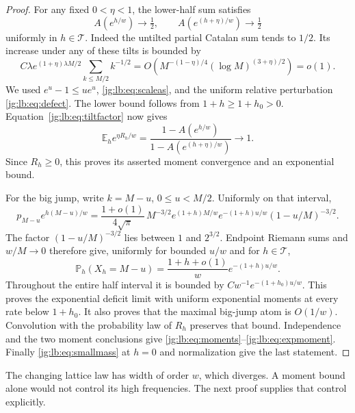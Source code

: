 \documentclass[11pt,a4paper]{article}
\theoremstyle{definition}\newaliascnt{definition}{theorem}
\theoremstyle{remark}\newaliascnt{remark}{theorem}
\newcommand{\ljP}{\mathbb P}
\newcommand{\ljE}{\mathbb E}
\begin{document}
\begin{proof}
For any fixed $0<\eta<1$, the lower-half sum satisfies
\begin{equation}\label{jg:lb:eq:smallmass}
 A(e^{h/w})\to\tfrac12,\qquad A(e^{(h+\eta)/w})\to\tfrac12
\end{equation}
uniformly in $h\in\mathcal T$. Indeed the untilted partial Catalan sum tends to
$1/2$. Its increase under any of these tilts is bounded by
\[
 C\lambda e^{(1+\eta)\lambda M/2}
       \sum_{k\le M/2}k^{-1/2}
 =O\!\left(M^{-(1-\eta)/4}
            (\log M)^{(3+\eta)/2}\right)=o(1).
\]
We used $e^u-1\le ue^u$, \eqref{jg:lb:eq:scaleas}, and the uniform relative
perturbation \eqref{jg:lb:eq:defect}. The lower bound follows from
$1+h\ge1+h_0>0$. Equation~\eqref{jg:lb:eq:tiltfactor} now gives
\[
 \ljE_h e^{\eta R_h/w}
 =\frac{1-A(e^{h/w})}{1-A(e^{(h+\eta)/w})}\longrightarrow1.
\]
Since $R_h\ge0$, this proves its asserted moment convergence and an
exponential bound.

For the big jump, write $k=M-u$, $0\le u<M/2$. Uniformly on that interval,
\[
 p_{M-u}e^{h(M-u)/w}
 =\frac{1+o(1)}{4\sqrt\pi}\,
     M^{-3/2}e^{(1+h)M/w}
     e^{-(1+h)u/w}(1-u/M)^{-3/2}.
\]
The factor $(1-u/M)^{-3/2}$ lies between $1$ and $2^{3/2}$. Endpoint Riemann
sums and $w/M\to0$ therefore give, uniformly for bounded $u/w$ and for
$h\in\mathcal T$,
\[
 \ljP_h(X_h=M-u)=\frac{1+h+o(1)}w e^{-(1+h)u/w}.
\]
Throughout the entire half interval it is bounded by
$Cw^{-1}e^{-(1+h_0)u/w}$. This proves the exponential deficit limit with
uniform exponential moments at every rate below $1+h_0$. It also proves that
the maximal big-jump atom is $O(1/w)$. Convolution with the probability law of
$R_h$ preserves that bound. Independence and the two moment conclusions give
\eqref{jg:lb:eq:moments}--\eqref{jg:lb:eq:expmoment}. Finally
\eqref{jg:lb:eq:smallmass} at $h=0$ and normalization give the last statement.
\end{proof}

The changing lattice law has width of order $w$, which diverges. A moment bound
alone would not control its high frequencies. The next proof supplies that
control explicitly.
\end{document}
